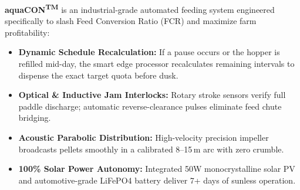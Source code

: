 \documentclass[10pt,a4paper]{article}
\begin{document}
\begin{minipage}[t]{0.488\linewidth}
  \begin{tcolorbox}[
    enhanced,
    colback=CardBg,
    colframe=TealPrimary,
    arc=2mm,
    boxrule=1.1pt,
    title={\fontsize{8.5}{10.5}\selectfont \textbf{\textcolor{white}{The aquaCON\textsuperscript{\tiny TM} Solution: Autonomous Precision Dosing}}},
    coltitle=white,
    colbacktitle=TealPrimary,
    top=7pt, bottom=7pt, left=8pt, right=8pt
  ]
    {\fontsize{7.8}{10.8}\selectfont \textcolor{TextPrimary}{
    \textbf{aquaCON\textsuperscript{\tiny TM}} is an industrial-grade automated feeding system engineered specifically to slash Feed Conversion Ratio (FCR) and maximize farm profitability:
    \begin{itemize}[leftmargin=11pt, itemsep=3.5pt, topsep=3pt, parsep=0pt]
      \item \textbf{Dynamic Schedule Recalculation:} If a pause occurs or the hopper is refilled mid-day, the smart edge processor recalculates remaining intervals to dispense the exact target quota before dusk.
      \item \textbf{Optical \& Inductive Jam Interlocks:} Rotary stroke sensors verify full paddle discharge; automatic reverse-clearance pulses eliminate feed chute bridging.
      \item \textbf{Acoustic Parabolic Distribution:} High-velocity precision impeller broadcasts pellets smoothly in a calibrated 8--15\,m arc with zero crumble.
      \item \textbf{100\% Solar Power Autonomy:} Integrated 50W monocrystalline solar PV and automotive-grade LiFePO4 battery deliver 7+ days of sunless operation.
    \end{itemize}
    }}
  \end{tcolorbox}
\end{minipage}

\vspace{5pt}
\end{document}
